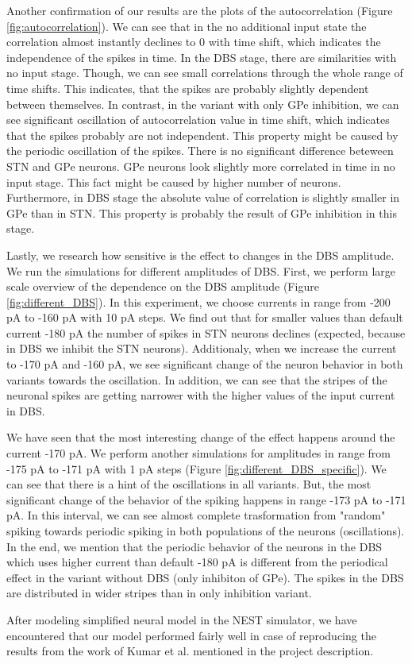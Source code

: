 \documentclass[11pt]{article}
\begin{document}
Another confirmation of our results are the plots of the autocorrelation 
(Figure \ref{fig:autocorrelation}). We can see that in the
no additional input state the correlation almost instantly declines to 0 with time shift, 
which indicates the independence of the spikes in time. In the DBS stage, there are 
similarities with no input stage. Though, we can see small correlations through the whole
range of time shifts. This indicates, that the spikes are probably slightly dependent
between themselves. In contrast, in the variant with only GPe inhibition, we can see 
significant oscillation of autocorrelation value in time shift, 
which indicates that the spikes probably are not 
independent. This property might be caused by the periodic oscillation of the spikes.
There is no significant difference beteween STN and GPe neurons. GPe neurons look
slightly more correlated in time in no input stage. This fact might be caused by 
higher number of neurons. Furthermore, in DBS stage the absolute value of correlation 
is slightly smaller in GPe than in STN. This property is probably the result of 
GPe inhibition in this stage.

Lastly, we research how sensitive is the effect to changes in the DBS
amplitude. We run the simulations for different amplitudes of DBS. First, we
perform large scale overview of the dependence on the DBS amplitude 
(Figure \ref{fig:different_DBS}). In this experiment, we choose currents
in range from -200 pA to -160 pA with 10 pA steps. We find out that for smaller 
values than default current -180 pA the number of spikes in STN neurons declines
(expected, because in DBS we inhibit the STN neurons). Additionaly, when we
increase the current to -170 pA and -160 pA, we see significant change 
of the neuron behavior in both variants towards the oscillation. In addition,
we can see that the stripes of the neuronal
spikes are getting narrower with the higher values of the input current in DBS.

We have seen that the most interesting change of the effect happens around 
the current -170 pA. We perform another simulations for amplitudes in range 
from -175 pA to -171 pA with 1 pA steps 
(Figure \ref{fig:different_DBS_specific}). We can see that there is a hint of
the oscillations in all variants. But, the most significant change of the behavior
of the spiking happens in range -173 pA to -171 pA. In this interval, we can see
almost complete trasformation from "random" spiking  towards periodic spiking
in both populations of the neurons (oscillations). In the end, we mention that the periodic behavior
of the neurons in the DBS which uses higher current than default -180 pA is 
different from the periodical effect in the variant without DBS (only inhibiton of GPe).
The spikes in the DBS are distributed in wider stripes than in only inhibition variant.

After modeling simplified neural model in the NEST simulator, we have encountered that
our model performed fairly well in case of reproducing the results from the work of 
Kumar et al. mentioned in the project description.
\end{document}
